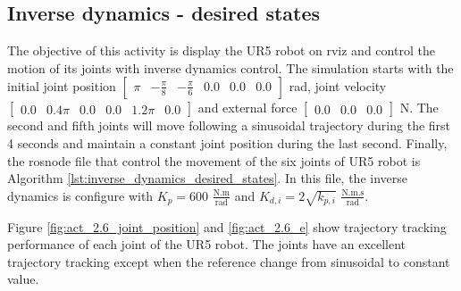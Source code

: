 \subsection{Inverse dynamics - desired states}
The objective of this activity is display the UR5 robot on rviz and control the motion of its joints with inverse dynamics control. The simulation starts with the initial joint position $\begin{bmatrix} \pi & -\frac{\pi}{8} & -\frac{\pi}{6} & 0.0 & 0.0 & 0.0 \end{bmatrix}$ rad, joint velocity $\begin{bmatrix} 0.0 & 0.4\pi & 0.0 & 0.0 & 1.2\pi & 0.0 \end{bmatrix}$ and external force $\begin{bmatrix} 0.0 & 0.0 & 0.0 \end{bmatrix}$ N. The second and fifth joints will move following a sinusoidal trajectory during the first 4 seconds and maintain a constant joint position during the last second. Finally, the rosnode file that control the movement of the six joints of UR5 robot is Algorithm \ref{lst:inverse_dynamics_desired_states}. In this file, the inverse dynamics is configure with $K_p=600$ $\mathrm{\frac{N.m}{rad}}$ and $K_{d,i}=2\sqrt{k_{p,i}}$ $\mathrm{\frac{N.m.s}{rad}}$.

Figure \ref{fig:act_2.6_joint_position} and \ref{fig:act_2.6_e} show trajectory tracking performance of each joint of the UR5 robot. The joints have an excellent trajectory tracking except when the reference change from sinusoidal to constant value.

